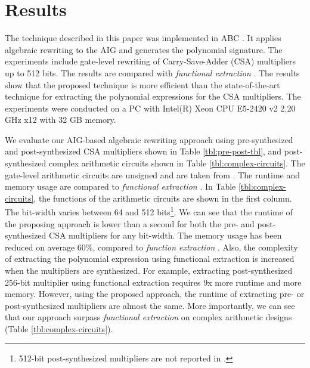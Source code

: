 \section{Results}

The technique described in this paper was implemented in ABC \cite{abc-link}. It applies algebraic rewriting to the AIG and generates the polynomial signature. The experiments include gate-level rewriting of Carry-Save-Adder (CSA) multipliers up to 512 bits. The results are compared with \textit{functional extraction} \cite{ciesielski2015verification}.
The results show that the proposed technique is more efficient than the state-of-the-art technique for extracting the polynomial expressions for the CSA multipliers. The experiments were conducted on a PC with Intel(R) Xeon CPU E5-2420 v2 2.20 GHz x12 with 32 GB memory.

We evaluate our AIG-based algebraic rewriting approach using pre-synthesized and post-synthesized CSA multipliers shown in Table \ref{tbl:pre-post-tbl}, and post-synthesized complex arithmetic circuits shown in Table \ref{tbl:complex-circuits}. The gate-level arithmetic circuits are unsigned and are taken from \cite{ciesielski2015verification}. The runtime and memory usage are compared to \textit{functional extraction} \cite{ciesielski2015verification}. In Table \ref{tbl:complex-circuits}, the functions of the arithmetic circuits are shown in the first column.
The bit-width varies between 64 and 512 bits\footnote{512-bit post-synthesized multipliers are not reported in \cite{ciesielski2015verification}.}. We can see that the runtime of the proposing approach is lower than a second for both the pre- and post-synthesized CSA multipliers for any bit-width. The memory usage has been reduced on average 60\%, compared to \textit{function extraction} \cite{ciesielski2015verification}. Also, the complexity of extracting the polynomial expression using functional extraction is increased when the multipliers are synthesized. For example, extracting post-synthesized 256-bit multiplier using functional extraction requires 9x more runtime and more memory. However, using the proposed approach, the runtime of extracting pre- or post-synthesized multipliers are almost the same. More importantly, we can see that our approach surpass \textit{functional extraction} on complex arithmetic designs (Table \ref{tbl:complex-circuits}).




%
%

%
